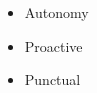 %
%
%

\twocolumnsection
{
\begin{skills}
\end{skills}}
{
\vspace{1em}
\begin{itemize}
	\item Autonomy
    \item Proactive
    \item Punctual
\end{itemize}
}
